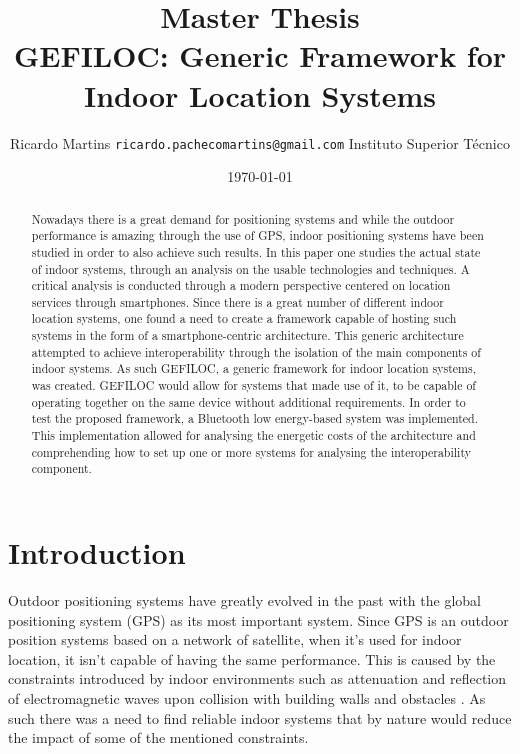 \documentclass[a4paper]{IEEEtran}
\title{{ \normalsize Master Thesis} \\ 
GEFILOC: Generic Framework for Indoor Location Systems}
\author{ 
Ricardo Martins {\tt ricardo.pachecomartins@gmail.com} 
Instituto Superior T\'{e}cnico}
\date{\today}
\begin{document}
 
\maketitle 
 
 
\begin{abstract} 
 
 
Nowadays there is a great demand for positioning systems and while the outdoor performance is amazing through the use of GPS, indoor positioning systems have been studied in order to also achieve such results. In this paper one studies the actual state of indoor systems, through an analysis on the usable technologies and techniques. A critical analysis is conducted through a modern perspective centered on location services through smartphones. Since there is a great number of different indoor location systems, one found a need to create a framework capable of hosting such systems in the form of a smartphone-centric architecture. This generic architecture attempted to achieve  interoperability  through the isolation of the main components of indoor systems. As such GEFILOC, a generic framework for indoor location systems, was created. GEFILOC would allow for systems that made use of it, to be capable of operating together on the same device without additional requirements. In order to test the proposed framework, a Bluetooth low energy-based system was implemented. This implementation allowed for analysing the energetic costs of the architecture and comprehending how to set up one or more systems for analysing the interoperability component.  
 
 
\end{abstract} 
 
 
\section{Introduction} 
\label{sec:Introduction} 
 
 
Outdoor positioning systems have greatly evolved in the past with the global positioning system (GPS) as its most important system. Since GPS is an outdoor position systems based on a network of satellite, when it's used for indoor location, it isn't capable of having the same performance. This is caused by the constraints introduced by indoor environments such as attenuation and reflection of electromagnetic waves upon collision with building walls and obstacles \cite{survey1}. As such there was a need to find reliable indoor systems that by nature would reduce the impact of some of the mentioned constraints. 
 
\end{document}

